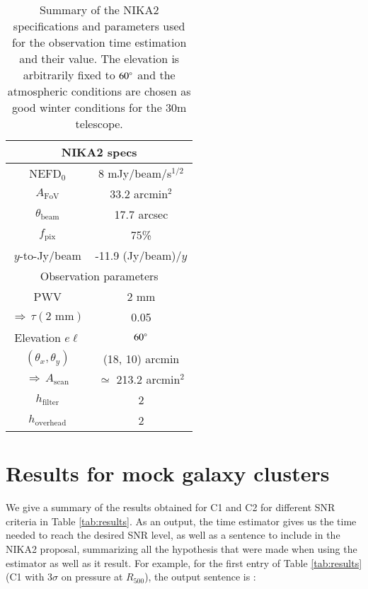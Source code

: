 \documentclass[11pt]{article}
\newcommand{\fh}{_{500}}
\begin{document}
\begin{table}[ht]
    \centering
    \begin{tabular}{c c}
        \toprule
        \multicolumn{2}{c}{NIKA2 specs} \\ 
        \midrule
        NEFD$_0$  &  8 mJy/beam/s$^{1/2}$ \\
        $A_\mathrm{FoV}$  &  33.2 arcmin$^2$ \\
        $\theta_\mathrm{beam}$  &  17.7 arcsec \\
        $f_\mathrm{pix}$  &  75\% \\
        $y$-to-Jy/beam  &  -11.9 (Jy/beam)/$y$ \\
        \midrule
        \multicolumn{2}{c}{Observation parameters} \\ 
        \midrule
        PWV  &  2 mm \\
        $\Rightarrow\,\tau(\text{2 mm})$  &  0.05 \\
        Elevation $e\ell$  &  $60\degree$ \\
        $(\theta_x, \theta_y)$  &  (18, 10) arcmin \\
        $\Rightarrow\,A_\mathrm{scan}$  &  $\simeq$ 213.2 arcmin$^2$ \\
        $h_\mathrm{filter}$  &  2 \\
        $h_\mathrm{overhead}$  &  2 \\
        \bottomrule
    \end{tabular}
    \caption{Summary of the NIKA2 specifications and parameters used for the observation time estimation and their value. The elevation is arbitrarily fixed to $60\degree$ and the atmospheric conditions are chosen as good winter conditions for the 30m telescope.}
    \label{tab:params}
\end{table}

\newpage
\section{Results for mock galaxy clusters}

We give a summary of the results obtained for C1 and C2 for different SNR criteria in Table \ref{tab:results}.
As an output, the time estimator gives us the time needed to reach the desired SNR level, as well as a sentence to include in the NIKA2 proposal, summarizing all the hypothesis that were made when using the estimator as well as it result.
For example, for the first entry of Table \ref{tab:results} (C1 with $3\sigma$ on pressure at $R\fh$), the output sentence is :
\end{document}
